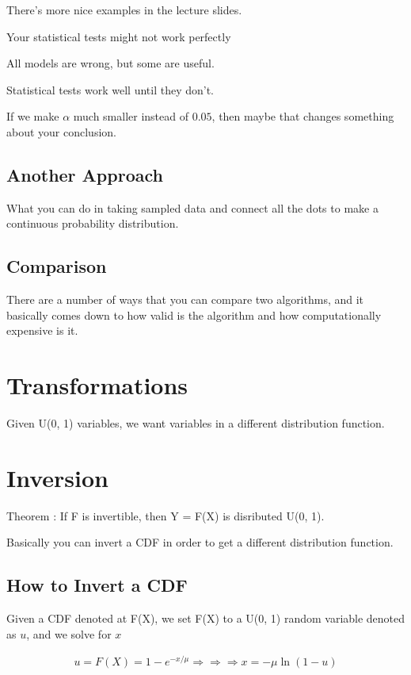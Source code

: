 \documentclass[fleqn]{report}
\newcommand{\equations} [1] {
\begin{gather*}
#1
\end{gather*}
}
\begin{document}
There's more nice examples in the lecture slides. 

Your statistical tests might not work perfectly 

All models are wrong, but some are useful. 

Statistical tests work well until they don't.

If we make $\alpha$ much smaller instead of $0.05$, then maybe that changes 
something about your conclusion. 

\subsection{Another Approach}
What you can do in taking sampled data and connect all the dots to make a 
continuous probability distribution. 

\subsection{Comparison}
There are a number of ways that you can compare two algorithms, and it basically 
comes down to how valid is the algorithm and how computationally expensive is it. 

\section{Transformations}
Given U(0, 1) variables, we want variables in a different distribution function. 

\section{Inversion}

Theorem : If F is invertible, then Y = F(X) is disributed U(0, 1). 

Basically you can invert a CDF in order to get a different distribution function. 

\subsection{How to Invert a CDF}

Given a CDF denoted at F(X), we set F(X) to a U(0, 1) random variable denoted 
as $u$, and we solve for $x$ 

\equations{
    u = F(X) = 1 - e^{-x / \mu}
    \Rightarrow 
    \Rightarrow 
    \Rightarrow 
    x = - \mu \ln(1 - u)
}
\end{document}
